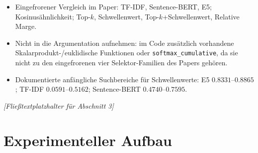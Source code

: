 \documentclass[11pt]{article}
\begin{document}
\begin{faktenbox}
\begin{itemize}
    \item Eingefrorener Vergleich im Paper: TF-IDF, Sentence-BERT, E5; Kosinusähnlichkeit; Top-$k$, Schwellenwert, Top-$k$+Schwellenwert, Relative Marge.
    \item Nicht in die Argumentation aufnehmen: im Code zus\"atzlich vorhandene Skalarprodukt-/euklidische Funktionen oder \texttt{softmax\_cumulative}, da sie nicht zu den eingefrorenen vier Selektor-Familien des Papers geh\"oren.
    \item Dokumentierte anfängliche Suchbereiche für Schwellenwerte: E5 $0.8331$--$0.8865$; TF-IDF $0.0591$--$0.5162$; Sentence-BERT $0.4740$--$0.7595$.
\end{itemize}
\end{faktenbox}

\textit{[Fließtextplatzhalter für Abschnitt 3]}


\section{Experimenteller Aufbau}
\end{document}
